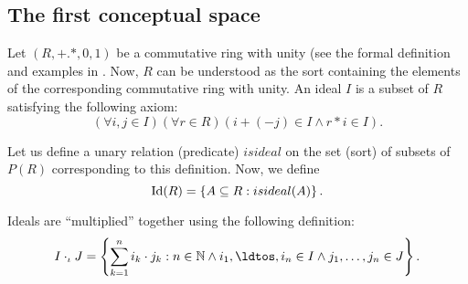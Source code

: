 

\subsection{The first conceptual space}
Let $(R,+.*,0,1)$ be a commutative ring with unity (see the formal
definition and examples in \cite{eisenbud}. Now, $R$ can be understood
as the sort containing the elements of the corresponding commutative
ring with unity.  An ideal $I$ is a subset of $R$ satisfying the
following axiom:
\[(\forall i,j\in I)(\forall r\in R)(i+(-j)\in I \wedge r*i\in I).\]

Let us define a unary relation (predicate) $isideal$
on the set (sort) of subsets of $P(R)$ corresponding to this definition.
Now, we define
\[{\rm Id}(R)=\left\{A\subseteq R: isideal(A) \right\}.\]

Ideals are ``multiplied'' together using the following definition:
%
%
\[I\cdot_{\iota} J=\left\{\sum_{k=1}^ni_k\cdot j_k:n \in \mathbb{N} \wedge i_1, \ldtos, i_n\in I \wedge j_1, \ldots, j_n\in J \right\}.\]

